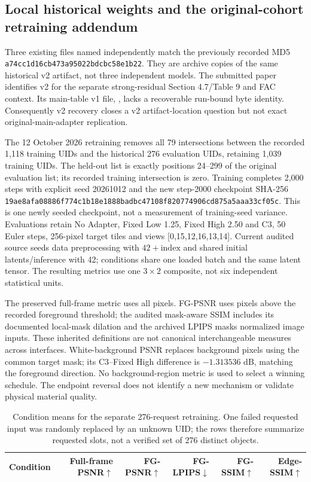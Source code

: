 \documentclass[11pt]{article}
\begin{document}
\subsection*{Local historical weights and the original-cohort retraining addendum}
Three existing files named  independently match the previously recorded MD5 \texttt{a74cc1d16cb473a95022bdcbc58e1b22}. They are archive copies of the same historical v2 artifact, not three independent models. The submitted paper identifies v2 for the separate strong-residual Section 4.7/Table 9 and FAC context. Its main-table v1 file, , lacks a recoverable run-bound byte identity. Consequently v2 recovery closes a v2 artifact-location question but not exact original-main-adapter replication.

The 12 October 2026 retraining removes all 79 intersections between the recorded 1,118 training UIDs and the historical 276 evaluation UIDs, retaining 1,039 training UIDs. The held-out list is exactly positions 24--299 of the original evaluation list; its recorded training intersection is zero. Training completes 2,000 steps with explicit seed 20261012 and the new step-2000 checkpoint SHA-256 \texttt{19ae8afa08886f774c1b18e1888badbc47108f820774906cd875a5aaa33cf05c}. This is one newly seeded checkpoint, not a measurement of training-seed variance. Evaluations retain No Adapter, Fixed Low 1.25, Fixed High 2.50 and C3, 50 Euler steps, 256-pixel target tiles and views [0,15,12,16,13,14]. Current audited source seeds data preprocessing with $42+\mathrm{index}$ and shared initial latents/inference with 42; conditions share one loaded batch and the same latent tensor. The resulting metrics use one $3\times2$ composite, not six independent statistical units.

The preserved full-frame metric uses all pixels. FG-PSNR uses pixels above the recorded foreground threshold; the audited mask-aware SSIM includes its documented local-mask dilation and the archived LPIPS masks normalized image inputs. These inherited definitions are not canonical interchangeable measures across interfaces. White-background PSNR replaces background pixels using the common target mask; its C3--Fixed High difference is $-1.313536$ dB, matching the foreground direction. No background-region metric is used to select a winning schedule. The endpoint reversal does not identify a new mechanism or validate physical material quality.

\begin{table}[t]
\centering\scriptsize\setlength{\tabcolsep}{5pt}
\caption{Condition means for the separate 276-request retraining. One failed requested input was randomly replaced by an unknown UID; the rows therefore summarize requested slots, not a verified set of 276 distinct objects.}
\label{tab:supp-original276-means}
\begin{tabular}{lrrrrr}
\toprule Condition & Full-frame PSNR$\uparrow$ & FG-PSNR$\uparrow$ & FG-LPIPS$\downarrow$ & FG-SSIM$\uparrow$ & Edge-SSIM$\uparrow$ \\
\midrule

\bottomrule
\end{tabular}
\end{table}
\end{document}
